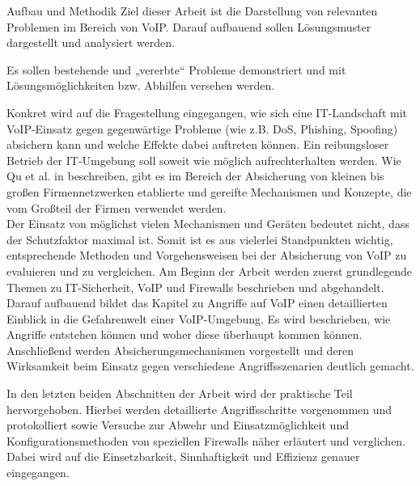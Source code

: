 \DIFdelbegin %
\DIFdelend \DIFaddbegin \label{Aufbau und Methodik}
\begin{section}{Aufbau und Methodik}
\DIFaddend Ziel dieser Arbeit ist die \DIFaddbegin {}\DIFaddend Darstellung von relevanten 
Problemen im Bereich von VoIP\DIFdelbegin {}\DIFdelend . Darauf aufbauend sollen Lösungsmuster dargestellt und analysiert werden. 

Es sollen bestehende und „vererbte“ Probleme demonstriert und mit Lösungsmöglichkeiten bzw. Abhilfen versehen werden. 
\DIFdelbegin {}%

\DIFdelend Konkret wird auf die Fragestellung eingegangen, wie sich eine IT-Landschaft mit VoIP-Einsatz gegen gegenwärtige Probleme (wie z.B. DoS\DIFdelbegin {}\DIFdelend , Phishing, Spoofing) absichern kann und welche Effekte dabei auftreten können. Ein reibungsloser Betrieb der IT-Umgebung soll soweit wie möglich aufrechterhalten werden.
Wie Qu et al. in \cite{Qu:2009:desactv}  beschreiben, gibt es im Bereich der Absicherung von kleinen bis großen Firmennetzwerken  etablierte und gereifte Mechanismen und Konzepte, die vom Großteil der Firmen verwendet werden. 
\\
Der Einsatz von möglichst vielen Mechanismen und Geräten bedeutet nicht, dass der Schutzfaktor maximal ist. Somit ist es aus vielerlei Standpunkten wichtig, entsprechende Methoden und Vorgehensweisen bei der Absicherung von VoIP zu evaluieren und zu vergleichen.
Am Beginn der Arbeit werden zuerst grundlegende Themen zu IT-Sicherheit, VoIP und Firewalls beschrieben und abgehandelt. Darauf aufbauend bildet das Kapitel zu Angriffe auf VoIP einen detaillierten Einblick in die Gefahrenwelt einer VoIP-Umgebung. Es wird beschrieben, wie Angriffe entstehen können und woher diese überhaupt kommen können. Anschließend werden  Absicherungsmechanismen vorgestellt und deren Wirksamkeit beim Einsatz gegen verschiedene Angriffsszenarien deutlich gemacht.

In den letzten beiden Abschnitten der Arbeit wird der praktische Teil hervorgehoben. Hierbei werden detaillierte Angriffsschritte vorgenommen und protokolliert sowie Versuche zur Abwehr und Einsatzmöglichkeit und Konfigurationsmethoden von speziellen Firewalls näher erläutert und verglichen. Dabei wird auf die Einsetzbarkeit, Sinnhaftigkeit und Effizienz genauer eingegangen.
\DIFdelbegin %


\end{section}
